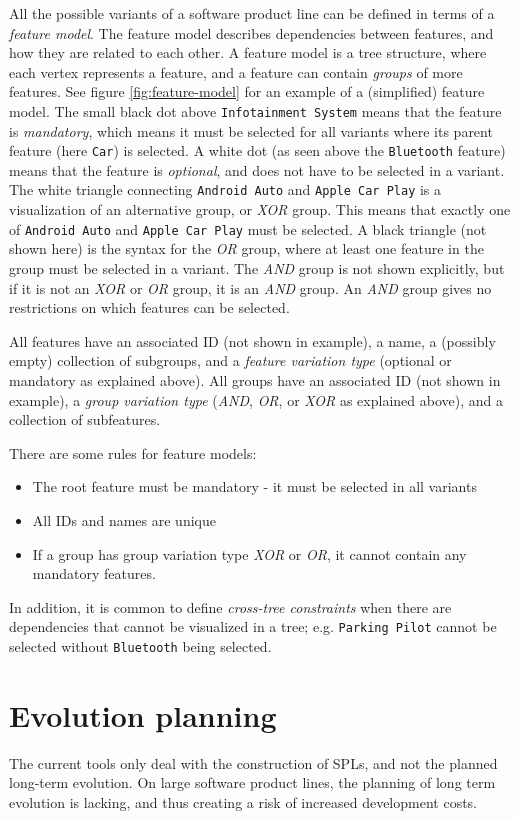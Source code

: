 \documentclass[a4paper,english]{ifimaster}
\begin{document}
All the possible variants of a software product line can be defined in terms of a \emph{feature model}. The feature model describes dependencies between features, and how they are related to each other. A feature model is a tree structure, where each vertex represents a feature, and a feature can contain \emph{groups} of more features. See figure \vref{fig:feature-model} for an example of a (simplified) feature model. The small black dot above \texttt{Infotainment System} means that the feature is \emph{mandatory}, which means it must be selected for all variants where its parent feature (here \texttt{Car}) is selected. A white dot (as seen above the \texttt{Bluetooth} feature) means that the feature is \emph{optional}, and does not have to be selected in a variant. The white triangle connecting \texttt{Android Auto} and \texttt{Apple Car Play} is a visualization of an alternative group, or \textit{XOR} group. This means that exactly one of \texttt{Android Auto} and \texttt{Apple Car Play} must be selected. A black triangle (not shown here) is the syntax for the \textit{OR} group, where at least one feature in the group must be selected in a variant. The \textit{AND} group is not shown explicitly, but if it is not an \textit{XOR} or \textit{OR} group, it is an \textit{AND} group. An \textit{AND} group gives no restrictions on which features can be selected.

All features have an associated ID (not shown in example), a name, a (possibly empty) collection of subgroups, and a \emph{feature variation type} (optional or mandatory as explained above). All groups have an associated ID (not shown in example), a \textit{group variation type} (\textit{AND}, \textit{OR}, or \textit{XOR} as explained above), and a collection of subfeatures.

There are some rules for feature models: 
\begin{itemize}
  \item The root feature must be mandatory - it must be selected in all variants
  \item All IDs and names are unique
  \item If a group has group variation type \textit{XOR} or \textit{OR}, it cannot contain any mandatory features.
\end{itemize}
In addition, it is common to define \emph{cross-tree constraints} when there are dependencies that cannot be visualized in a tree; e.g. \texttt{Parking Pilot} cannot be selected without \texttt{Bluetooth} being selected.
\section{Evolution planning}
\label{sec:evolution-planning}
The current tools only deal with the construction of SPLs, and not the planned long-term evolution. %
On large software product lines, the planning of long term evolution is lacking, and thus creating a risk of increased development costs. 
\end{document}

